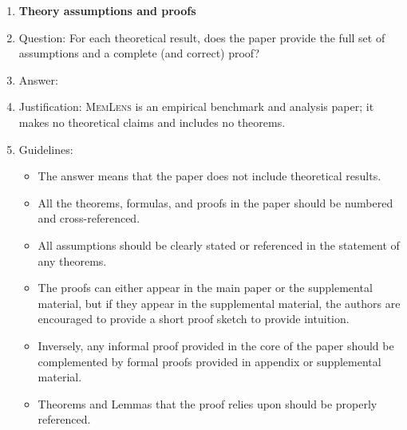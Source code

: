 \documentclass{article}
\newcommand{\bench}{\textsc{MemLens}}
\begin{document}
\begin{enumerate}
\item {\bf Theory assumptions and proofs}
    \item[] Question: For each theoretical result, does the paper provide the full set of assumptions and a complete (and correct) proof?
    \item[] Answer: \answerNA{}
    \item[] Justification: \bench{} is an empirical benchmark and analysis paper; it makes no theoretical claims and includes no theorems.
    \item[] Guidelines:
    \begin{itemize}
        \item The answer \answerNA{} means that the paper does not include theoretical results.
        \item All the theorems, formulas, and proofs in the paper should be numbered and cross-referenced.
        \item All assumptions should be clearly stated or referenced in the statement of any theorems.
        \item The proofs can either appear in the main paper or the supplemental material, but if they appear in the supplemental material, the authors are encouraged to provide a short proof sketch to provide intuition.
        \item Inversely, any informal proof provided in the core of the paper should be complemented by formal proofs provided in appendix or supplemental material.
        \item Theorems and Lemmas that the proof relies upon should be properly referenced.
    \end{itemize}


\end{enumerate}
\end{document}
